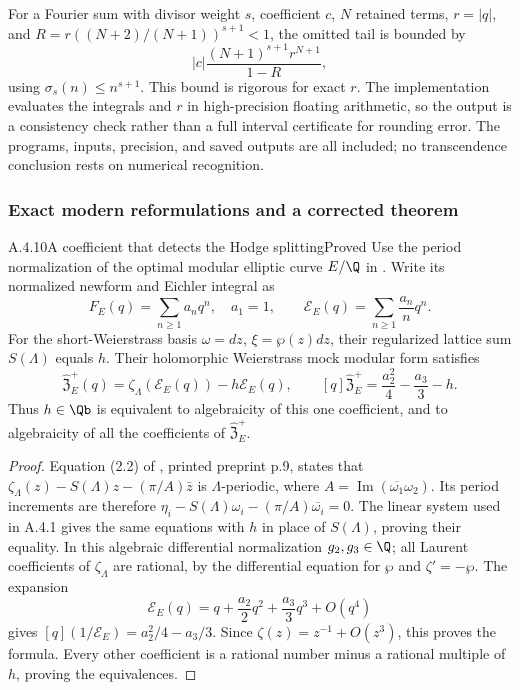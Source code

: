 For a Fourier sum with divisor weight $s$, coefficient $c$, $N$ retained terms, $r=|q|$, and $R=r((N+2)/(N+1))^{s+1}<1$, the omitted tail is bounded by
\[
 |c|\frac{(N+1)^{s+1}r^{N+1}}{1-R},
\]
using $\sigma_s(n)\le n^{s+1}$. This bound is rigorous for exact $r$. The implementation evaluates the integrals and $r$ in high-precision floating arithmetic, so the output is a consistency check rather than a full interval certificate for rounding error. The programs, inputs, precision, and saved outputs are all included; no transcendence conclusion rests on numerical recognition.
\subsubsection{Exact modern reformulations and a corrected theorem}

\begin{result}{A.4.10}{A coefficient that detects the Hodge splitting}{Proved}
Use the period normalization of the optimal modular elliptic curve $E/\Q$ in \cite{EllAGOR2015}. Write its normalized newform and Eichler integral as
\[
 F_E(q)=\sum_{n\ge1}a_nq^n,\quad a_1=1,
 \qquad \mathcal E_E(q)=\sum_{n\ge1}\frac{a_n}{n}q^n.
\]
For the short-Weierstrass basis $\omega=dz$, $\xi=\wp(z)dz$, their regularized lattice sum $S(\Lambda)$ equals $h$. Their holomorphic Weierstrass mock modular form satisfies
\[
 \widehat{\mathfrak Z}_E^+(q)
 =\zeta_\Lambda(\mathcal E_E(q))-h\mathcal E_E(q),
 \qquad
 [q]\widehat{\mathfrak Z}_E^+
 =\frac{a_2^2}{4}-\frac{a_3}{3}-h.
\]
Thus $h\in\Qb$ is equivalent to algebraicity of this one coefficient, and to algebraicity of all the coefficients of $\widehat{\mathfrak Z}_E^+$.
\end{result}
\begin{proof}
Equation (2.2) of \cite{EllAGOR2015}, printed preprint p.9, states that
$\zeta_\Lambda(z)-S(\Lambda)z-(\pi/A)\bar z$ is $\Lambda$-periodic, where $A=\operatorname{Im}(\overline{\omega_1}\omega_2)$. Its period increments are therefore
$\eta_i-S(\Lambda)\omega_i-(\pi/A)\overline{\omega_i}=0$.
The linear system used in A.4.1 gives the same equations with $h$ in place of $S(\Lambda)$, proving their equality. In this algebraic differential normalization $g_2,g_3\in\Q$; all Laurent coefficients of $\zeta_\Lambda$ are rational, by the differential equation for $\wp$ and $\zeta'=-\wp$. The expansion
\[
 \mathcal E_E(q)=q+\frac{a_2}{2}q^2+\frac{a_3}{3}q^3+O(q^4)
\]
gives $[q](1/\mathcal E_E)=a_2^2/4-a_3/3$. Since $\zeta(z)=z^{-1}+O(z^3)$, this proves the formula. Every other coefficient is a rational number minus a rational multiple of $h$, proving the equivalences.
\end{proof}

